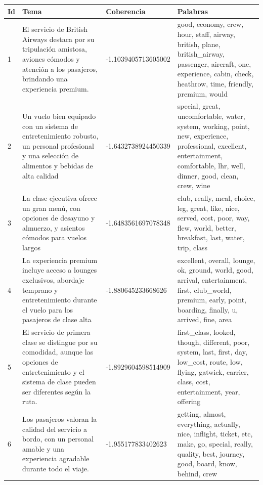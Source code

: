 \documentclass{report}
\begin{document}
{{\begin{longtable}{|p{1cm}|p{4cm}|p{4cm}|p{6cm}|}
                    \hline
                    \textbf{Id} & \textbf{Tema} & \textbf{Coherencia} & \textbf{Palabras} \\
                    \hline
                    1 & El servicio de British Airways destaca por su tripulación amistosa, aviones cómodos y atención a los pasajeros, brindando una experiencia premium. & -1.1039405713605002 & good, economy, crew, hour, staff, airway, british, plane, british\_airway, passenger, aircraft, one, experience, cabin, check, heathrow, time, friendly, premium, would \\
                    \hline
                    2 & Un vuelo bien equipado con un sistema de entretenimiento robusto, un personal profesional y una selección de alimentos y bebidas de alta calidad & -1.6432738924450339 & special, great, uncomfortable, water, system, working, point, new, experience, professional, excellent, entertainment, comfortable, lhr, well, dinner, good, clean, crew, wine \\
                    \hline
                    3 & La clase ejecutiva ofrece un gran menú, con opciones de desayuno y almuerzo, y asientos cómodos para vuelos largos & -1.6483561697078348 & club, really, meal, choice, leg, great, like, nice, served, cost, poor, way, flew, world, better, breakfast, last, water, trip, class \\
                    \hline
                    4 & La experiencia premium incluye acceso a lounges exclusivos, abordaje temprano y entretenimiento durante el vuelo para los pasajeros de clase alta & -1.880645233668626 & excellent, overall, lounge, ok, ground, world, good, arrival, entertainment, first, club\_world, premium, early, point, boarding, finally, u, arrived, fine, area \\
                    \hline
                    5 & El servicio de primera clase se distingue por su comodidad, aunque las opciones de entretenimiento y el sistema de clase pueden ser diferentes según la ruta. & -1.8929604598514909 & first\_class, looked, though, different, poor, system, last, first, day, low\_cost, route, low, flying, gatwick, carrier, class, cost, entertainment, year, offering \\
                    \hline
                    6 & Los pasajeros valoran la calidad del servicio a bordo, con un personal amable y una experiencia agradable durante todo el viaje. & -1.955177833402623 & getting, almost, everything, actually, nice, inflight, ticket, etc, make, go, special, really, quality, best, journey, good, board, know, behind, crew \\

\end{longtable}}}
\end{document}
